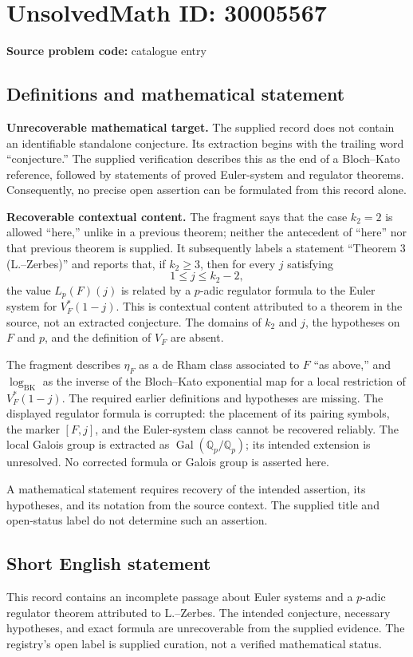 \documentclass[11pt]{article}
\newcommand{\Q}{\mathbb{Q}}
\begin{document}
\section*{UnsolvedMath ID: 30005567}
\textbf{Source problem code:} catalogue entry
\subsection{Definitions and mathematical statement}
\textbf{Unrecoverable mathematical target.} The supplied record does not contain an identifiable standalone conjecture. Its extraction begins with the trailing word ``conjecture.'' The supplied verification describes this as the end of a Bloch--Kato reference, followed by statements of proved Euler-system and regulator theorems. Consequently, no precise open assertion can be formulated from this record alone.

\textbf{Recoverable contextual content.} The fragment says that the case \(k_2=2\) is allowed ``here,'' unlike in a previous theorem; neither the antecedent of ``here'' nor that previous theorem is supplied. It subsequently labels a statement ``Theorem 3 (L.--Zerbes)'' and reports that, if \(k_2\geq 3\), then for every \(j\) satisfying
\[
1\leq j\leq k_2-2,
\]
the value \(L_p(F)(j)\) is related by a \(p\)-adic regulator formula to the Euler system for \(V_F^{*}(1-j)\). This is contextual content attributed to a theorem in the source, not an extracted conjecture. The domains of \(k_2\) and \(j\), the hypotheses on \(F\) and \(p\), and the definition of \(V_F\) are absent.

The fragment describes \(\eta_F\) as a de Rham class associated to \(F\) ``as above,'' and \(\log_{\mathrm{BK}}\) as the inverse of the Bloch--Kato exponential map for a local restriction of \(V_F^{*}(1-j)\). The required earlier definitions and hypotheses are missing. The displayed regulator formula is corrupted: the placement of its pairing symbols, the marker \([F,j]\), and the Euler-system class cannot be recovered reliably. The local Galois group is extracted as \(\operatorname{Gal}(\Q_p/\Q_p)\); its intended extension is unresolved. No corrected formula or Galois group is asserted here.

A mathematical statement requires recovery of the intended assertion, its hypotheses, and its notation from the source context. The supplied title and open-status label do not determine such an assertion.
\subsection{Short English statement}
This record contains an incomplete passage about Euler systems and a \(p\)-adic regulator theorem attributed to L.--Zerbes. The intended conjecture, necessary hypotheses, and exact formula are unrecoverable from the supplied evidence. The registry's open label is supplied curation, not a verified mathematical status.
\end{document}
